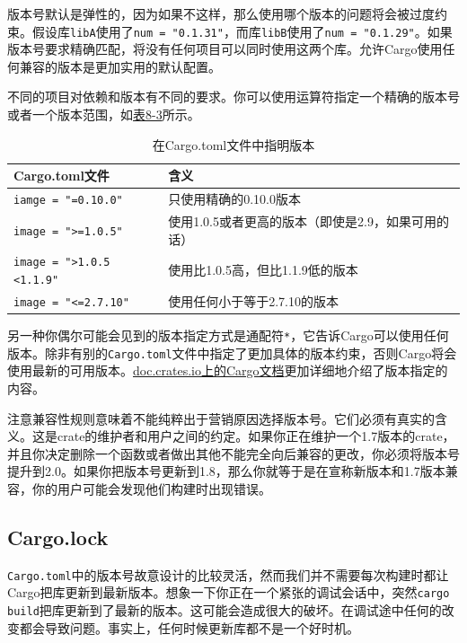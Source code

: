 版本号默认是弹性的，因为如果不这样，那么使用哪个版本的问题将会被过度约束。假设库\texttt{libA}使用了\texttt{num = "0.1.31"}，而库\texttt{libB}使用了\texttt{num = "0.1.29"}。如果版本号要求精确匹配，将没有任何项目可以同时使用这两个库。允许Cargo使用任何兼容的版本是更加实用的默认配置。

不同的项目对依赖和版本有不同的要求。你可以使用运算符指定一个精确的版本号或者一个版本范围，如\hyperref[t8-3]{表8-3}所示。

\begin{table}[htbp]
    \centering
    \caption{在Cargo.toml文件中指明版本}
    \label{t8-3}
    \begin{tabular}{p{}p{}}
        \hline
        \textbf{Cargo.toml文件} & \textbf{含义} \\
        \hline
        \texttt{iamge = "=0.10.0"}  & 只使用精确的0.10.0版本 \\
        \rowcolor{tablecolor}
        \texttt{image = ">=1.0.5"}  & 使用1.0.5或者更高的版本（即使是2.9，如果可用的话） \\
        \texttt{image = ">1.0.5 <1.1.9"} & 使用比1.0.5高，但比1.1.9低的版本 \\
        \rowcolor{tablecolor}
        \texttt{image = "<=2.7.10"} & 使用任何小于等于2.7.10的版本 \\
    \end{tabular}
\end{table}

另一种你偶尔可能会见到的版本指定方式是通配符\texttt{*}，它告诉Cargo可以使用任何版本。除非有别的\texttt{Cargo.toml}文件中指定了更加具体的版本约束，否则Cargo将会使用最新的可用版本。\href{https://doc.rust-lang.org/cargo/reference/specifying-dependencies.html}{doc.crates.io上的Cargo文档}更加详细地介绍了版本指定的内容。

注意兼容性规则意味着不能纯粹出于营销原因选择版本号。它们必须有真实的含义。这是crate的维护者和用户之间的约定。如果你正在维护一个1.7版本的crate，并且你决定删除一个函数或者做出其他不能完全向后兼容的更改，你必须将版本号提升到2.0。如果你把版本号更新到1.8，那么你就等于是在宣称新版本和1.7版本兼容，你的用户可能会发现他们构建时出现错误。

\subsection{Cargo.lock}
\texttt{Cargo.toml}中的版本号故意设计的比较灵活，然而我们并不需要每次构建时都让Cargo把库更新到最新版本。想象一下你正在一个紧张的调试会话中，突然\texttt{cargo build}把库更新到了最新的版本。这可能会造成很大的破坏。在调试途中任何的改变都会导致问题。事实上，任何时候更新库都不是一个好时机。

